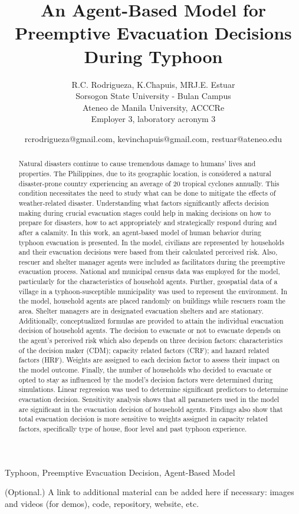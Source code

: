 \documentclass{gamadays}
\title{\textbf{An Agent-Based Model for Preemptive Evacuation Decisions During Typhoon}}
\author{R.C. Rodrigueza\up{1,2}, K.Chapuis\up{3}, MRJ.E. Estuar\up{2}\\[6pt]
\up{1} Sorsogon State University - Bulan Campus\\
\up{2} Ateneo de Manila University, ACCCRe\\
\up{3} Employer 3, laboratory acronym 3\\
}
\date{rcrodrigueza@gmail.com, kevinchapuis@gmail.com, restuar@ateneo.edu}
\begin{document}
\maketitle


\begin{keywords}
Typhoon, Preemptive Evacuation Decision, Agent-Based Model
\end{keywords}

\begin{abstract}

Natural disasters continue to cause tremendous damage to humans' lives and properties. The Philippines, due to its geographic location, is considered a natural disaster-prone country experiencing an average of 20 tropical cyclones annually. This condition necessitates the need to study what can be done to mitigate the effects of weather-related disaster. Understanding what factors significantly affects decision making during crucial evacuation stages could help in making decisions on how to prepare for disasters, how to act appropriately and strategically respond during and after a calamity. In this work, an agent-based model of human behavior during typhoon evacuation is presented. In the model, civilians are represented by households and their evacuation decisions were based from their calculated perceived risk. Also, rescuer and shelter manager agents were included as facilitators during the preemptive evacuation process. National and municipal census data was employed for the model, particularly for the characteristics of household agents. Further, geospatial data of a village in a typhoon-susceptible municipality was used to represent the environment. In the model, household agents are placed randomly on buildings while rescuers roam the area. Shelter managers are in designated evacuation shelters and are stationary. Additionally, conceptualized formulas are provided to attain the individual evacuation decision of household agents. The decision to evacuate or not to evacuate depends on the agent's perceived risk which also depends on three decision factors: characteristics of the decision maker (CDM); capacity related factors (CRF); and hazard related factors (HRF). Weights are assigned to each decision factor to assess their impact on the model outcome. Finally, the number of households who decided to evacuate or opted to stay as influenced by the model’s decision factors were determined during simulations. Linear regression was used to determine significant predictors to determine evacuation decision. Sensitivity analysis shows that all parameters used in the model are significant in the evacuation decision of household agents. Findings also show that total evacuation decision is more sensitive to weights assigned in capacity related factors, specifically type of house, floor level and past typhoon experience.
\vspace{0.5cm}

\end{abstract}

\begin{additionnalMaterial}
(Optional.) A link to additional material can be added here if necessary: images and videos (for demos), code, repository, website, etc.
\end{additionnalMaterial}
\end{document}

